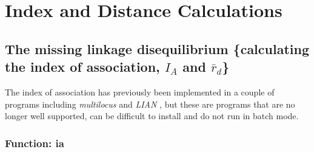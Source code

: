 \documentclass[letterpaper]{article}
\newcommand{\tab}{\hspace*{1em}}
\begin{document}
\section{Index and Distance Calculations}\label{index}
\subsection{The missing linkage disequilibrium \{calculating the index of association, $I_A$ and $\bar r_d$\}}\label{index:iard}

\tab\tab The index of association has previously been implemented in a couple of programs including \textit{multilocus} \cite{Agapow:2001} and \textit{LIAN} \cite{Haubold:2000}, but these are programs that are no longer well supported, can be difficult to install and do not run in batch mode.
\subsubsection{Function: ia}\label{index:iard:ia}
\end{document}
